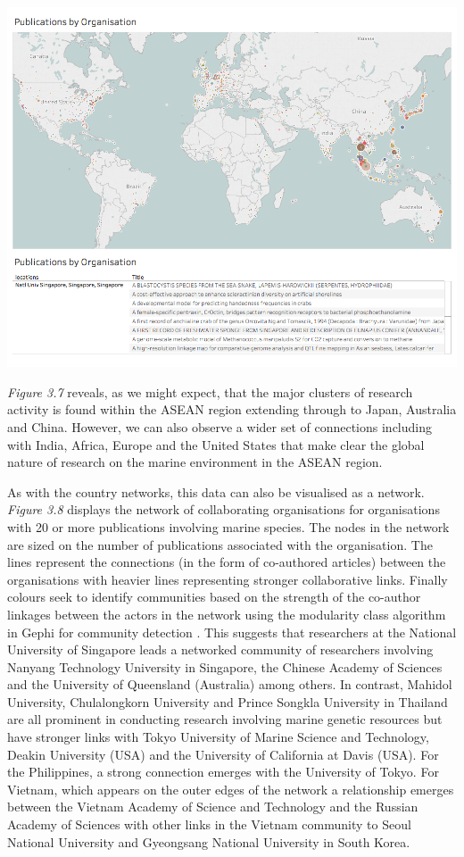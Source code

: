 \documentclass[]{book}
\theoremstyle{definition}
\theoremstyle{definition}
\theoremstyle{definition}
\theoremstyle{remark}
\begin{document}
\includegraphics[width=13.89in]{images/aseanmarinlit_organisation}

\emph{Figure 3.7} reveals, as we might expect, that the major clusters
of research activity is found within the ASEAN region extending through
to Japan, Australia and China. However, we can also observe a wider set
of connections including with India, Africa, Europe and the United
States that make clear the global nature of research on the marine
environment in the ASEAN region.

As with the country networks, this data can also be visualised as a
network. \emph{Figure 3.8} displays the network of collaborating
organisations for organisations with 20 or more publications involving
marine species. The nodes in the network are sized on the number of
publications associated with the organisation. The lines represent the
connections (in the form of co-authored articles) between the
organisations with heavier lines representing stronger collaborative
links. Finally colours seek to identify communities based on the
strength of the co-author linkages between the actors in the network
using the modularity class algorithm in Gephi for community detection
\citep{Blondel_2008}. This suggests that researchers at the National
University of Singapore leads a networked community of researchers
involving Nanyang Technology University in Singapore, the Chinese
Academy of Sciences and the University of Queensland (Australia) among
others. In contrast, Mahidol University, Chulalongkorn University and
Prince Songkla University in Thailand are all prominent in conducting
research involving marine genetic resources but have stronger links with
Tokyo University of Marine Science and Technology, Deakin University
(USA) and the University of California at Davis (USA). For the
Philippines, a strong connection emerges with the University of Tokyo.
For Vietnam, which appears on the outer edges of the network a
relationship emerges between the Vietnam Academy of Science and
Technology and the Russian Academy of Sciences with other links in the
Vietnam community to Seoul National University and Gyeongsang National
University in South Korea.
\end{document}
